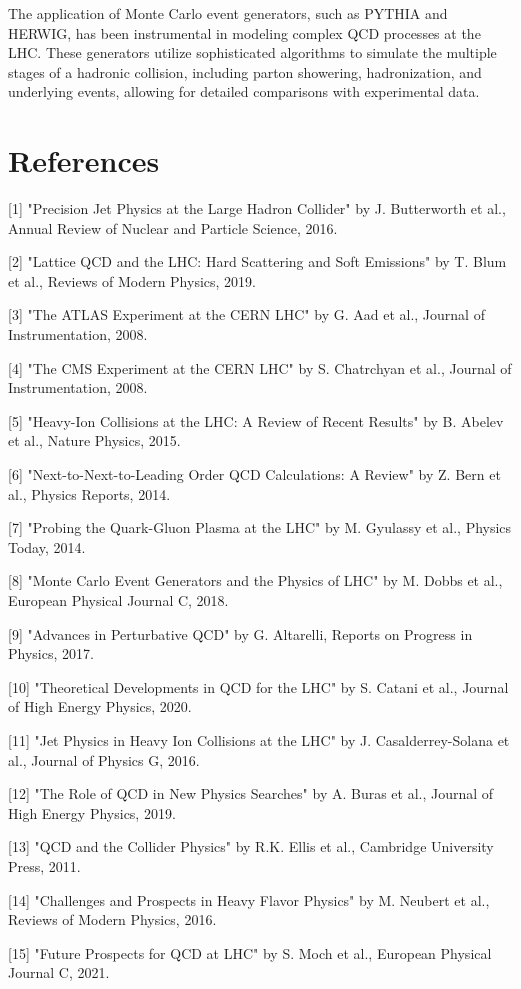\documentclass{article}
\begin{document}
The application of Monte Carlo event generators, such as PYTHIA and HERWIG, has been instrumental in modeling complex QCD processes at the LHC. These generators utilize sophisticated algorithms to simulate the multiple stages of a hadronic collision, including parton showering, hadronization, and underlying events, allowing for detailed comparisons with experimental data.

\section*{References}
[1] "Precision Jet Physics at the Large Hadron Collider" by J. Butterworth et al., Annual Review of Nuclear and Particle Science, 2016.

[2] "Lattice QCD and the LHC: Hard Scattering and Soft Emissions" by T. Blum et al., Reviews of Modern Physics, 2019.

[3] "The ATLAS Experiment at the CERN LHC" by G. Aad et al., Journal of Instrumentation, 2008.

[4] "The CMS Experiment at the CERN LHC" by S. Chatrchyan et al., Journal of Instrumentation, 2008.

[5] "Heavy-Ion Collisions at the LHC: A Review of Recent Results" by B. Abelev et al., Nature Physics, 2015.

[6] "Next-to-Next-to-Leading Order QCD Calculations: A Review" by Z. Bern et al., Physics Reports, 2014.

[7] "Probing the Quark-Gluon Plasma at the LHC" by M. Gyulassy et al., Physics Today, 2014.

[8] "Monte Carlo Event Generators and the Physics of LHC" by M. Dobbs et al., European Physical Journal C, 2018.

[9] "Advances in Perturbative QCD" by G. Altarelli, Reports on Progress in Physics, 2017.

[10] "Theoretical Developments in QCD for the LHC" by S. Catani et al., Journal of High Energy Physics, 2020.

[11] "Jet Physics in Heavy Ion Collisions at the LHC" by J. Casalderrey-Solana et al., Journal of Physics G, 2016.

[12] "The Role of QCD in New Physics Searches" by A. Buras et al., Journal of High Energy Physics, 2019.

[13] "QCD and the Collider Physics" by R.K. Ellis et al., Cambridge University Press, 2011.

[14] "Challenges and Prospects in Heavy Flavor Physics" by M. Neubert et al., Reviews of Modern Physics, 2016.

[15] "Future Prospects for QCD at LHC" by S. Moch et al., European Physical Journal C, 2021.
\end{document}
